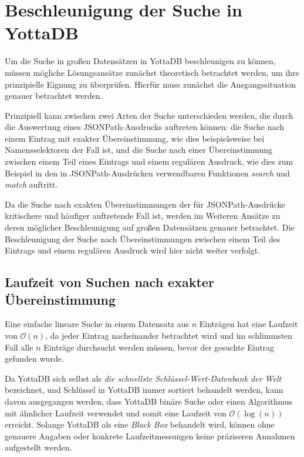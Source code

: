 \documentclass[oneside]{ausarbeitung}
\begin{document}
	
	
	
	
\section{Beschleunigung der Suche in YottaDB}
	
Um die Suche in großen Datensätzen in YottaDB beschleunigen zu können, müssen mögliche Lösungsansätze zunächst theoretisch betrachtet werden, um ihre prinzipielle Eignung zu überprüfen. Hierfür muss zunächst die Ausgangssituation genauer betrachtet werden.
	
Prinzipiell kann zwischen zwei Arten der Suche unterschieden werden, die durch die Auswertung eines JSONPath-Ausdrucks auftreten können: die Suche nach einem Eintrag mit exakter Übereinstimmung, wie dies beispielsweise bei Namensselektoren der Fall ist, und die Suche nach einer Übereinstimmung zwischen einem Teil eines Eintrags und einem regulären Ausdruck, wie dies zum Beispiel in den in JSONPath-Ausdrücken verwendbaren Funktionen \textit{search} und \textit{match} auftritt. 
	
Da die Suche nach exakten Übereinstimmungen der für JSONPath-Ausdrücke kritischere und häufiger auftretende Fall ist, werden im Weiteren Ansätze zu deren möglicher Beschleunigung auf großen Datensätzen genauer betrachtet. Die Beschleunigung der Suche nach Übereinstimmungen zwischen einem Teil des Eintrags und einem regulären Ausdruck wird hier nicht weiter verfolgt. 
	
	
	
\subsection{Laufzeit von Suchen nach exakter Übereinstimmung}
	
Eine einfache lineare Suche in einem Datensatz aus $n$ Einträgen hat eine Laufzeit von $\mathcal{O}(n)$, da jeder Eintrag nacheinander betrachtet wird und im schlimmsten Fall alle $n$ Einträge durchsucht werden müssen, bevor der gesuchte Eintrag gefunden wurde.
	
Da YottaDB sich selbst als \textit{die schnellste Schlüssel-Wert-Datenbank der Welt} bezeichnet, %
und Schlüssel in YottaDB immer sortiert behandelt werden, kann davon ausgegangen werden, dass YottaDB binäre Suche oder einen Algorithmus mit ähnlicher Laufzeit verwendet und somit eine Laufzeit von $\mathcal{O}(\log(n))$ erreicht. Solange YottaDB als eine \textit{Black Box} behandelt wird, können ohne genauere Angaben oder konkrete Laufzeitmessungen keine präziseren Annahmen aufgestellt werden.
	
\end{document}
